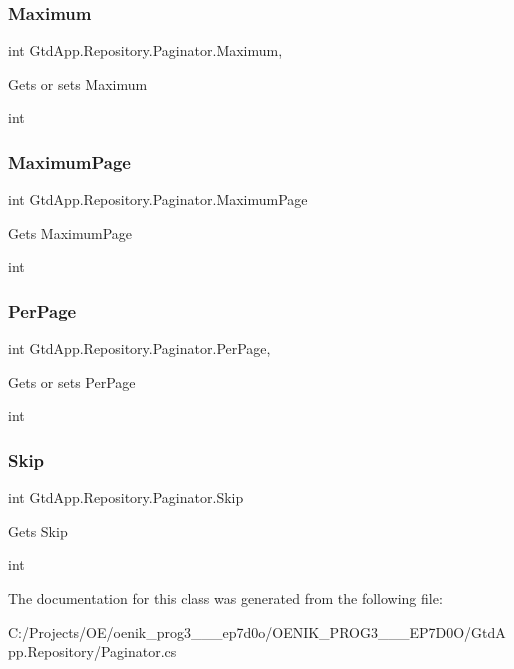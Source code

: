 \subsubsection{Maximum}
{\footnotesize\ttfamily int Gtd\+App.\+Repository.\+Paginator.\+Maximum\hspace{0.3cm}{\ttfamily [get]}, {\ttfamily [set]}}



Gets or sets Maximum 

int\mbox{\label{class_gtd_app_1_1_repository_1_1_paginator_ae25073eb95f1a18b74c188adb5d43617}} 
\subsubsection{Maximum\+Page}
{\footnotesize\ttfamily int Gtd\+App.\+Repository.\+Paginator.\+Maximum\+Page\hspace{0.3cm}{\ttfamily [get]}}



Gets Maximum\+Page 

int\mbox{\label{class_gtd_app_1_1_repository_1_1_paginator_a47b791460f8dedb296d18d2211a329fd}} 
\subsubsection{Per\+Page}
{\footnotesize\ttfamily int Gtd\+App.\+Repository.\+Paginator.\+Per\+Page\hspace{0.3cm}{\ttfamily [get]}, {\ttfamily [set]}}



Gets or sets Per\+Page 

int\mbox{\label{class_gtd_app_1_1_repository_1_1_paginator_a73cc899e1e4213c0db38eb05df585d9d}} 
\subsubsection{Skip}
{\footnotesize\ttfamily int Gtd\+App.\+Repository.\+Paginator.\+Skip\hspace{0.3cm}{\ttfamily [get]}}



Gets Skip 

int

The documentation for this class was generated from the following file\+:\begin{DoxyCompactItemize}
\item 
C\+:/\+Projects/\+O\+E/oenik\+\_\+prog3\+\_\+\_\+\_\+ep7d0o/\+O\+E\+N\+I\+K\+\_\+\+P\+R\+O\+G3\+\_\+\_\+\_\+\+E\+P7\+D0\+O/\+Gtd\+App.\+Repository/Paginator.\+cs\end{DoxyCompactItemize}
